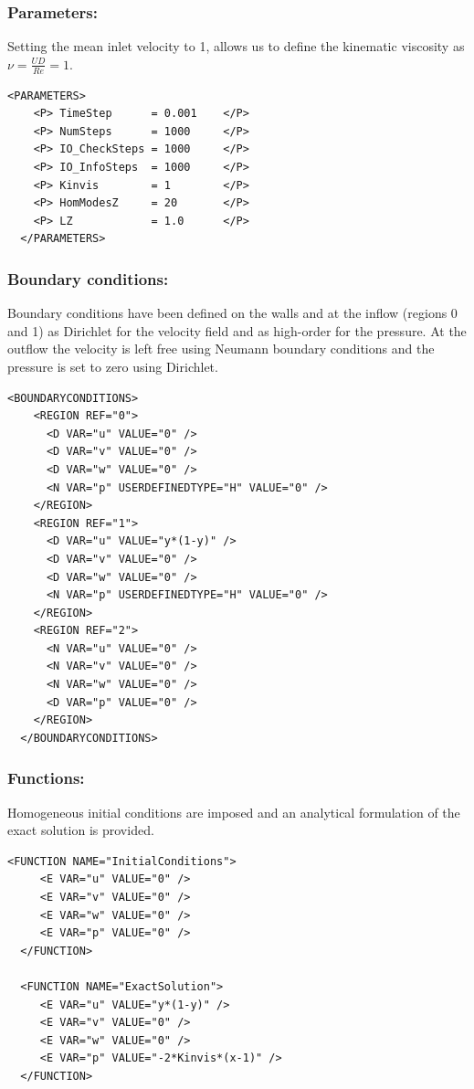 \subsubsection{Parameters:~} Setting the mean inlet velocity to 1, allows us to define the kinematic viscosity as $\nu = \frac{UD}{Re}=1$.
\begin{lstlisting}[style=XMLStyle]
  <PARAMETERS>
    <P> TimeStep      = 0.001    </P>
    <P> NumSteps      = 1000     </P>
    <P> IO_CheckSteps = 1000     </P>
    <P> IO_InfoSteps  = 1000     </P>
    <P> Kinvis        = 1        </P>
    <P> HomModesZ     = 20       </P>
    <P> LZ            = 1.0      </P>
  </PARAMETERS>
\end{lstlisting}

\subsubsection{Boundary conditions:~} Boundary conditions have been defined on the walls and at the inflow (regions 0 and 1) as Dirichlet for the velocity field and as high-order for the pressure. At the outflow the velocity is left free using Neumann boundary conditions and the pressure is set to zero using Dirichlet.
\begin{lstlisting}[style=XMLStyle]
  <BOUNDARYCONDITIONS>
    <REGION REF="0">
      <D VAR="u" VALUE="0" />
      <D VAR="v" VALUE="0" />
      <D VAR="w" VALUE="0" />
      <N VAR="p" USERDEFINEDTYPE="H" VALUE="0" />
    </REGION>
    <REGION REF="1">
      <D VAR="u" VALUE="y*(1-y)" />
      <D VAR="v" VALUE="0" />
      <D VAR="w" VALUE="0" />
      <N VAR="p" USERDEFINEDTYPE="H" VALUE="0" />
    </REGION>
    <REGION REF="2">
      <N VAR="u" VALUE="0" />
      <N VAR="v" VALUE="0" />
      <N VAR="w" VALUE="0" />
      <D VAR="p" VALUE="0" />
    </REGION>
  </BOUNDARYCONDITIONS>
\end{lstlisting}

\subsubsection{Functions:~} Homogeneous initial conditions are imposed and an analytical formulation of the exact solution is provided.
\begin{lstlisting}[style=XMLStyle]
  <FUNCTION NAME="InitialConditions">
     <E VAR="u" VALUE="0" />
     <E VAR="v" VALUE="0" />
     <E VAR="w" VALUE="0" />
     <E VAR="p" VALUE="0" />
  </FUNCTION>

  <FUNCTION NAME="ExactSolution">
     <E VAR="u" VALUE="y*(1-y)" />
     <E VAR="v" VALUE="0" />
     <E VAR="w" VALUE="0" />
     <E VAR="p" VALUE="-2*Kinvis*(x-1)" />
  </FUNCTION>
\end{lstlisting}


